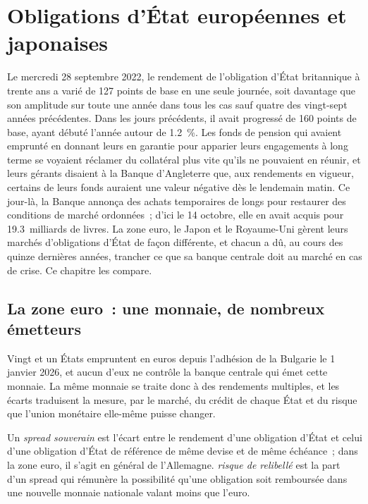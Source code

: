 \chapter{Obligations d'État européennes et japonaises}\label{ch:m2:european-and-japanese-government-bonds}

Le mercredi 28 septembre 2022, le rendement de l'obligation d'État britannique à trente ans
a varié de 127 points de base en une seule journée, soit davantage que son
amplitude sur toute une année dans tous les cas sauf quatre des vingt-sept années précédentes. Dans les jours
précédents, il avait progressé de 160 points de base, ayant débuté l'année autour de 1.2~\%.
Les fonds de pension qui avaient emprunté en donnant leurs  en garantie pour apparier leurs engagements à long
terme se voyaient réclamer du collatéral plus vite qu'ils ne pouvaient en réunir,
et leurs gérants disaient à la Banque d'Angleterre que, aux rendements en
vigueur, certains de leurs fonds auraient une valeur négative dès le lendemain
matin. Ce jour-là, la Banque annonça des achats temporaires de  longs pour
restaurer des conditions de marché ordonnées~; d'ici le 14 octobre, elle en avait acquis pour
19.3~milliards de livres. La zone euro, le Japon et le Royaume-Uni gèrent
leurs marchés d'obligations d'État de façon différente, et chacun a dû, au cours des quinze
dernières années, trancher ce que sa banque centrale doit au marché en cas de crise. Ce
chapitre les compare.

\section{La zone euro~: une monnaie, de nombreux émetteurs}

Vingt et un États empruntent en euros depuis l'adhésion de la Bulgarie le 1 janvier
2026, et aucun d'eux ne contrôle la banque centrale qui émet cette monnaie. La même monnaie se traite donc à des rendements multiples, et les
écarts traduisent la mesure, par le marché, du crédit de chaque État et du
risque que l'union monétaire elle-même puisse changer.

\begin{definition}\label{def:m2:european-and-japanese-government-bonds:spread}
Un \emph{spread souverain} est l'écart entre le
rendement d'une obligation d'État et celui d'une obligation d'État de référence de même
devise et de même échéance~; dans la zone euro, il s'agit en général de l'Allemagne. \emph{risque de
relibellé} est la part d'un spread qui rémunère la
possibilité qu'une obligation soit remboursée dans une nouvelle monnaie nationale valant moins
que l'euro.
\end{definition}

